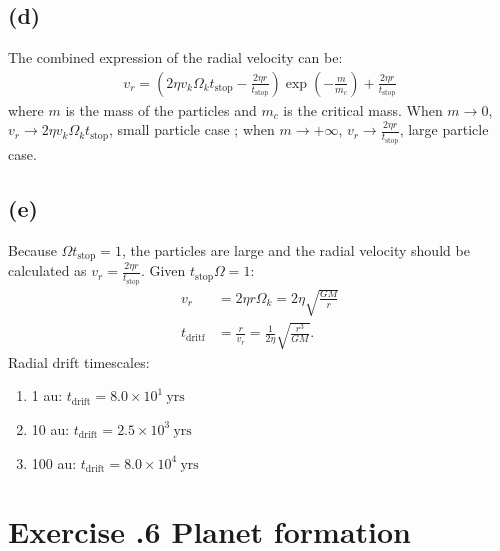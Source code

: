 \documentclass[a4paper,12pt]{article}
\begin{document}
\subsection*{(d)}
The combined expression of the radial velocity can be:
\begin{align*}
    v_r = (2\eta v_k \Omega_k t_\text{stop} - \frac{2\eta r}{t_\text{stop}})\exp(-\frac{m}{m_c}) + \frac{2\eta r}{t_\text{stop}}
\end{align*}
where $m$ is the mass of the particles and $m_c$ is the critical mass. When 
$m\rightarrow 0$, $v_r \rightarrow 2\eta v_k \Omega_k t_\text{stop}$, small particle case
; when $m\rightarrow +\infty$, $v_r \rightarrow \frac{2\eta r}{t_\text{stop}}$, large particle case.

\subsection*{(e)}
Because $\Omega t_\text{stop} = 1$, the particles are large and the radial velocity should be calculated as 
$v_r = \frac{2\eta r}{t_\text{stop}}$. Given $t_\text{stop} \Omega = 1$:
\begin{align*}
    v_r &= 2\eta r \Omega_k = 2\eta \sqrt{\frac{GM}{r}} \\
    t_\text{dritf} &= \frac{r}{v_r} = \frac{1}{2\eta} \sqrt{\frac{r^3}{GM}}.
\end{align*}
Radial drift timescales:
\begin{enumerate}
    \item[] 1 au: $t_\text{drift} = 8.0 \times 10^1 \ \text{yrs}$
    \item[] 10 au: $t_\text{drift} = 2.5 \times 10^3 \ \text{yrs}$ 
    \item[] 100 au: $t_\text{drift} = 8.0 \times 10^4 \ \text{yrs}$ 
\end{enumerate}

\section*{\textbf{Exercise \uppercase\expandafter{}.6 Planet formation}}
\end{document}
